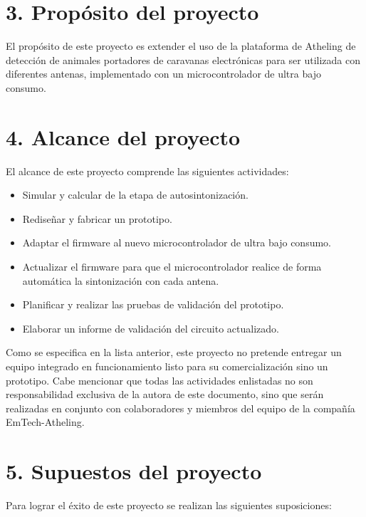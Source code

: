 \documentclass[
11pt, %
]{charter}
\begin{document}
\section{3. Propósito del proyecto}
\label{sec:proposito}

El propósito de este proyecto es extender el uso de la plataforma de Atheling de detección de animales portadores de caravanas electrónicas para ser utilizada con diferentes antenas, implementado con un microcontrolador de ultra bajo consumo.


\section{4. Alcance del proyecto}
\label{sec:alcance}

El alcance de este proyecto comprende las siguientes actividades:
\begin{itemize}
	\item Simular y calcular de la etapa de autosintonización.
	\item Rediseñar y fabricar un prototipo.
	\item Adaptar el firmware al nuevo microcontrolador de ultra bajo consumo.
	\item Actualizar el firmware para que el microcontrolador realice de forma automática la sintonización con cada antena.
	\item Planificar y realizar las pruebas de validación del prototipo.
	\item Elaborar un informe de validación del circuito actualizado.
\end{itemize}
Como se especifica en la lista anterior, este proyecto no pretende entregar un equipo integrado en funcionamiento listo para su comercialización sino un prototipo. Cabe mencionar que todas las actividades enlistadas no son responsabilidad exclusiva de la autora de este documento, sino que serán realizadas en conjunto con colaboradores y miembros del equipo de la compañía EmTech-Atheling. 

\section{5. Supuestos del proyecto}
\label{sec:supuestos}

Para lograr el éxito de este proyecto se realizan las siguientes suposiciones:
\end{document}
